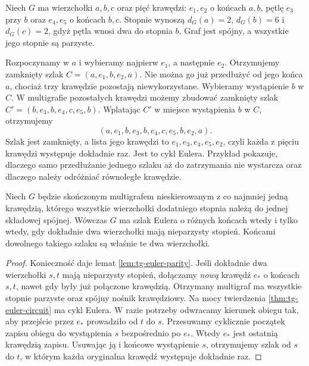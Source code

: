 \begin{przyklad}
\label{ex:tg-hierholzer-multigraf}
Niech $G$ ma wierzchołki $a,b,c$ oraz pięć krawędzi:
$e_1,e_2$ o końcach $a,b$, pętlę $e_3$ przy $b$
oraz $e_4,e_5$ o końcach $b,c$. Stopnie wynoszą
$d_G(a)=2$, $d_G(b)=6$ i $d_G(c)=2$, gdyż pętla
wnosi dwa do stopnia $b$. Graf jest spójny, a wszystkie
jego stopnie są parzyste.

Rozpoczynamy w $a$ i wybieramy najpierw $e_1$, a następnie
$e_2$. Otrzymujemy zamknięty szlak $C=(a,e_1,b,e_2,a)$.
Nie można go już przedłużyć od jego końca $a$, chociaż
trzy krawędzie pozostają niewykorzystane. Wybieramy
wystąpienie $b$ w $C$. W multigrafie pozostałych krawędzi
możemy zbudować zamknięty szlak
$C'=(b,e_3,b,e_4,c,e_5,b)$.
Wplatając $C'$ w miejsce wystąpienia $b$ w $C$,
otrzymujemy
\[
(a,e_1,b,e_3,b,e_4,c,e_5,b,e_2,a).
\]
Szlak jest zamknięty, a lista jego krawędzi to
$e_1,e_3,e_4,e_5,e_2$, czyli każda z pięciu krawędzi
występuje dokładnie raz. Jest to cykl Eulera.
Przykład pokazuje, dlaczego samo przedłużanie jednego
szlaku aż do zatrzymania nie wystarcza oraz dlaczego
należy odróżniać równoległe krawędzie.
\end{przyklad}

\begin{twierdzenie}
\label{thm:tg-euler-trail}
Niech $G$ będzie skończonym multigrafem nieskierowanym
z co najmniej jedną krawędzią, którego wszystkie wierzchołki
dodatniego stopnia należą do jednej składowej spójnej.
Wówczas $G$ ma szlak Eulera o różnych końcach wtedy
i tylko wtedy, gdy dokładnie dwa wierzchołki mają
nieparzysty stopień. Końcami dowolnego takiego szlaku
są właśnie te dwa wierzchołki.
\end{twierdzenie}

\begin{proof}
Konieczność daje lemat \ref{lem:tg-euler-parity}.
Jeśli dokładnie dwa wierzchołki $s,t$ mają nieparzysty
stopień, dołączamy \emph{nową} krawędź $e_*$ o końcach $s,t$,
nawet gdy były już połączone krawędzią. Otrzymany multigraf
ma wszystkie stopnie parzyste oraz spójny nośnik krawędziowy.
Na mocy twierdzenia \ref{thm:tg-euler-circuit} ma cykl Eulera.
W razie potrzeby odwracamy kierunek obiegu tak, aby
przejście przez $e_*$ prowadziło od $t$ do $s$.
Przesuwamy cyklicznie początek zapisu obiegu do wystąpienia
$s$ bezpośrednio po $e_*$. Wtedy $e_*$ jest ostatnią
krawędzią zapisu. Usuwając ją i końcowe wystąpienie $s$,
otrzymujemy szlak od $s$ do $t$, w którym każda
oryginalna krawędź występuje dokładnie raz.
\end{proof}

